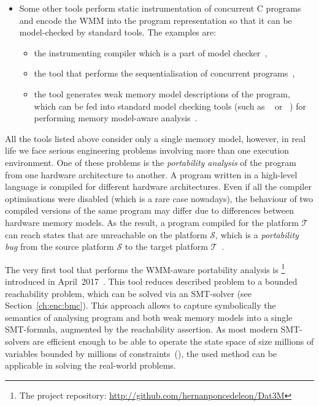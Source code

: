 \begin{itemize}[noitemsep,topsep=0pt,leftmargin=\parindent]
\item Some other tools perform static instrumentation of concurrent C programs and encode the WMM into the program representation so that it can be model-checked by standard tools.
The examples are:
\begin{itemize}[noitemsep,topsep=0pt]
\item the instrumenting compiler  which is a part of  model checker~\cite{kroening2014cbmc},
\item the tool that performs the sequentialisation of concurrent programs~\cite{alglave2013software},
\item the tool  generates weak memory model descriptions of the program, which can be fed into standard model checking tools (such as ~\cite{holzmann1997model} or ~\cite{cimatti2000nusmv}) for performing memory model-aware analysis~\cite{travkin2016verification}.
\end{itemize}

\end{itemize}


All the tools listed above consider only a single memory model, however, in real life we face serious engineering problems involving more than one execution environment.
One of these problems is the \textit{portability analysis} of the program from one hardware architecture to another.
A program written in a high-level language is compiled for different hardware architectures.
Even if all the compiler optimisations were disabled (which is a rare case nowadays), the behaviour of two compiled versions of the same program may differ due to differences between hardware memory models.
As the result, a program compiled for the platform $\mathcal{T}$ can reach states that are unreachable on the platform $\mathcal{S}$, which is a \textit{portability bug} from the source platform $\mathcal{S}$ to the target platform $\mathcal{T}$~\cite{Porthos17a}.

The very first tool that performs the WMM-aware portability analysis is \porthos{}%
%
\footnote{The \porthos{} project repository: \url{http://github.com/hernanponcedeleon/Dat3M}} %
%
introduced in April~2017~\cite{Porthos17a}.
This tool reduces described problem to a bounded reachability problem, which can be solved via an SMT-solver (see Section~\ref{ch:enc:bmc}).
This approach allows to capture symbolically the semantics of analysing program and both weak memory models into a single SMT-formula, augmented by the reachability assertion.
As most modern SMT-solvers are efficient enough to be able to operate the state space of size millions of variables bounded by millions of constraints~(\cite{malik2009boolean}), the used method can be applicable in solving the real-world problems.


